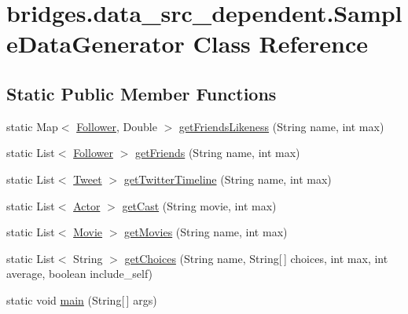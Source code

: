 \hypertarget{classbridges_1_1data__src__dependent_1_1_sample_data_generator}{}\section{bridges.\+data\+\_\+src\+\_\+dependent.\+Sample\+Data\+Generator Class Reference}
\label{classbridges_1_1data__src__dependent_1_1_sample_data_generator}
\subsection*{Static Public Member Functions}
\begin{DoxyCompactItemize}
\item 
static Map$<$ \hyperlink{classbridges_1_1data__src__dependent_1_1_follower}{Follower}, Double $>$ \hyperlink{classbridges_1_1data__src__dependent_1_1_sample_data_generator_a940034ad3107806e65741dca0a029d1b}{get\+Friends\+Likeness} (String name, int max)
\item 
static List$<$ \hyperlink{classbridges_1_1data__src__dependent_1_1_follower}{Follower} $>$ \hyperlink{classbridges_1_1data__src__dependent_1_1_sample_data_generator_a60ed9c5edd05d614f6ff5364edd5187e}{get\+Friends} (String name, int max)
\item 
static List$<$ \hyperlink{classbridges_1_1data__src__dependent_1_1_tweet}{Tweet} $>$ \hyperlink{classbridges_1_1data__src__dependent_1_1_sample_data_generator_a9e52e53de820233e76553f5db1a01c80}{get\+Twitter\+Timeline} (String name, int max)
\item 
static List$<$ \hyperlink{classbridges_1_1data__src__dependent_1_1_actor}{Actor} $>$ \hyperlink{classbridges_1_1data__src__dependent_1_1_sample_data_generator_a2e5c2ea6214a140a50b375f4e859ed0d}{get\+Cast} (String movie, int max)
\item 
static List$<$ \hyperlink{classbridges_1_1data__src__dependent_1_1_movie}{Movie} $>$ \hyperlink{classbridges_1_1data__src__dependent_1_1_sample_data_generator_a5b654cc82316f320ad9b001aa7cdcfb9}{get\+Movies} (String name, int max)
\item 
static List$<$ String $>$ \hyperlink{classbridges_1_1data__src__dependent_1_1_sample_data_generator_a5b93af083c764f1046ebb6d1b9ae8d6f}{get\+Choices} (String name, String\mbox{[}$\,$\mbox{]} choices, int max, int average, boolean include\+\_\+self)
\item 
static void \hyperlink{classbridges_1_1data__src__dependent_1_1_sample_data_generator_ae37dc24f262b58481822cf228bd97054}{main} (String\mbox{[}$\,$\mbox{]} args)
\end{DoxyCompactItemize}
